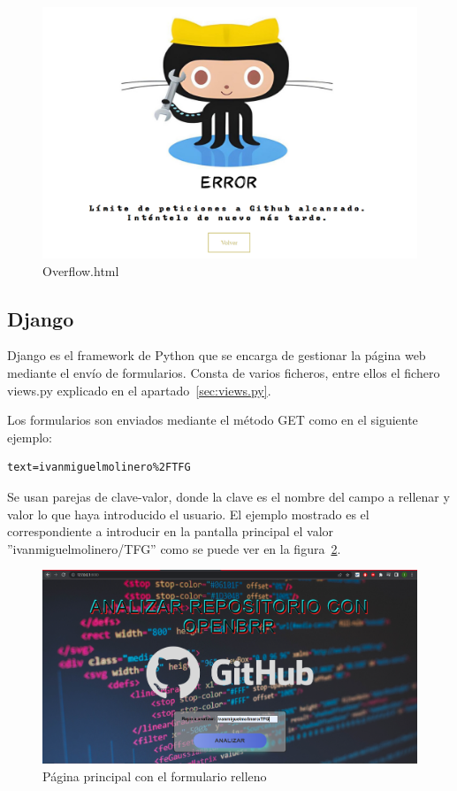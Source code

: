 \documentclass[a4paper, 12pt]{book}
\begin{document}
\begin{figure}
    \centering
    \includegraphics[bb=0 0 800 600, width=12cm, keepaspectratio]{img/overflow.png}
    \caption{Overflow.html}\label{fig:error overflow}
\end{figure}

\subsection{Django}

Django es el framework de Python que se encarga de gestionar la página web mediante el envío de formularios. Consta de varios ficheros, entre ellos el fichero views.py explicado en el apartado~\ref{sec:views.py}.

Los formularios son enviados mediante el método GET como en el siguiente ejemplo:

\begin{verbatim}
text=ivanmiguelmolinero%2FTFG
\end{verbatim}

Se usan parejas de clave-valor, donde la clave es el nombre del campo a rellenar y valor lo que haya introducido el usuario. El ejemplo mostrado es el correspondiente a introducir en la pantalla principal el valor ''ivanmiguelmolinero/TFG'' como se puede ver en la figura~\ref{fig:ivanmiguelmolinero/TFG}.

\begin{figure}
    
    \includegraphics[bb=0 0 800 600, width=12cm, keepaspectratio]{img/maintfg.png}
    \caption{Página principal con el formulario relleno}\label{fig:ivanmiguelmolinero/TFG}
\end{figure}
\end{document}
